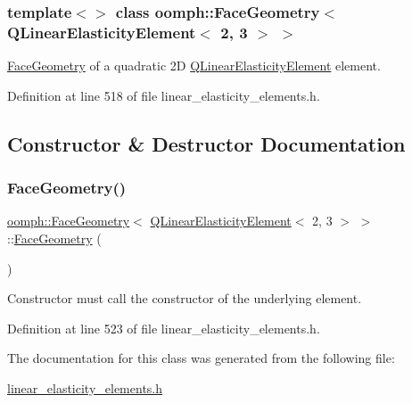\subsubsection*{template$<$$>$\newline
class oomph\+::\+Face\+Geometry$<$ Q\+Linear\+Elasticity\+Element$<$ 2, 3 $>$ $>$}

\hyperlink{classoomph_1_1FaceGeometry}{Face\+Geometry} of a quadratic 2D \hyperlink{classoomph_1_1QLinearElasticityElement}{Q\+Linear\+Elasticity\+Element} element. 

Definition at line 518 of file linear\+\_\+elasticity\+\_\+elements.\+h.



\subsection{Constructor \& Destructor Documentation}
\mbox{\label{classoomph_1_1FaceGeometry_3_01QLinearElasticityElement_3_012_00_013_01_4_01_4_ae533b9537dfb4e2ee4c86ee0cdced813}} 
\subsubsection{\texorpdfstring{Face\+Geometry()}{FaceGeometry()}}
{\footnotesize\ttfamily \hyperlink{classoomph_1_1FaceGeometry}{oomph\+::\+Face\+Geometry}$<$ \hyperlink{classoomph_1_1QLinearElasticityElement}{Q\+Linear\+Elasticity\+Element}$<$ 2, 3 $>$ $>$\+::\hyperlink{classoomph_1_1FaceGeometry}{Face\+Geometry} (\begin{DoxyParamCaption}{ }\end{DoxyParamCaption})\hspace{0.3cm}{\ttfamily [inline]}}



Constructor must call the constructor of the underlying element. 



Definition at line 523 of file linear\+\_\+elasticity\+\_\+elements.\+h.



The documentation for this class was generated from the following file\+:\begin{DoxyCompactItemize}
\item 
\hyperlink{linear__elasticity__elements_8h}{linear\+\_\+elasticity\+\_\+elements.\+h}\end{DoxyCompactItemize}
